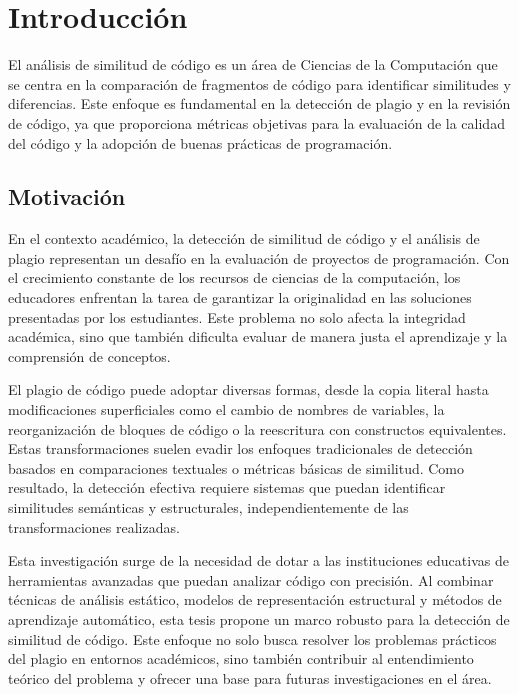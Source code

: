 \chapter*{Introducción}\label{chapter:introduction}

El análisis de similitud de código es un área de Ciencias de la Computación que se centra en la comparación de fragmentos de código para identificar similitudes y diferencias. Este enfoque es fundamental en la detección de plagio y en la revisión de código, ya que proporciona métricas objetivas para la evaluación de la calidad del código y la adopción de buenas prácticas de programación. 

\section*{Motivación}

En el contexto académico, la detección de similitud de código y el análisis de plagio representan un desafío en la evaluación de proyectos de programación. Con el crecimiento constante de los recursos de ciencias de la computación, los educadores enfrentan la tarea de garantizar la originalidad en las soluciones presentadas por los estudiantes. Este problema no solo afecta la integridad académica, sino que también dificulta evaluar de manera justa el aprendizaje y la comprensión de conceptos.  

El plagio de código puede adoptar diversas formas, desde la copia literal hasta modificaciones superficiales como el cambio de nombres de variables, la reorganización de bloques de código o la reescritura con constructos equivalentes. Estas transformaciones suelen evadir los enfoques tradicionales de detección basados en comparaciones textuales o métricas básicas de similitud. Como resultado, la detección efectiva requiere sistemas que puedan identificar similitudes semánticas y estructurales, independientemente de las transformaciones realizadas.  

Esta investigación surge de la necesidad de dotar a las instituciones educativas de herramientas avanzadas que puedan analizar código con precisión. Al combinar técnicas de análisis estático, modelos de representación estructural y métodos de aprendizaje automático, esta tesis propone un marco robusto para la detección de similitud de código. Este enfoque no solo busca resolver los problemas prácticos del plagio en entornos académicos, sino también contribuir al entendimiento teórico del problema y ofrecer una base para futuras investigaciones en el área.  



